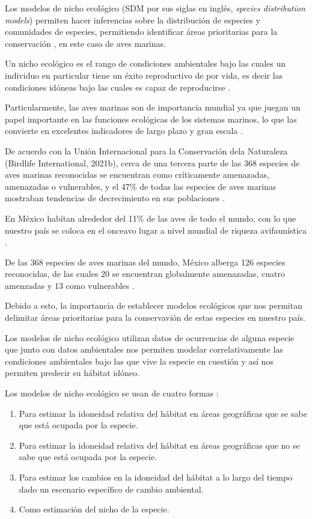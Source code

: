 \documentclass[runningheads,a4paper]{llncs}
\begin{document}
Los modelos de nicho ecológico (SDM por sus siglas en inglés, \textit{species
distribution models}) permiten hacer inferencias sobre la distribución
de especies y comunidades de especies, permitiendo identificar áreas
prioritarias para la conservación \cite{flores2019ecological}, en este caso de
aves marinas.

Un nicho ecológico es el rango de condiciones ambientales bajo las cuales un
individuo en particular tiene un éxito reproductivo de por vida, es decir las
condiciones idóneas bajo las cuales es capaz de reproducirse
\cite{takola2022hutchinson}.

Particularmente, las aves marinas son de importancia mundial ya que juegan un
papel importante en las funciones ecológicas de los sistemas marinos, lo que las
convierte en excelentes indicadores de largo plazo y gran escala
\cite{furness1997seabirds}.

De acuerdo con la Unión Internacional para la Conservación dela Naturaleza
(Birdlife International, 2021b), cerca de una tercera parte de las 368 especies
de aves marinas reconocidas se encuentran como críticamente amenazadas,
amenazadas o vulnerables, y el 47\% de todas las especies de aves marinas
mostraban tendencias de decrecimiento en sus poblaciones \cite{dias2019threats}.

En México habítan alrededor del 11\% de las aves de todo el mundo, con lo que
nuestro país se coloca en el onceavo lugar a nivel mundial de riqueza
avifaunística \cite{mendez2021ecologia}.

De las 368 especies de aves marinas del mundo, México alberga 126 especies
reconocidas, de las cuales 20 se encuentran globalmente amenazadas, cuatro
amenzadas y 13 como vulnerables \cite{mendez2021ecologia}.

Debido a esto, la importancia de establecer modelos ecológicos que nos permitan
delimitar áreas prioritarias para la conservavión de estas especies en nuestro país.

Los modelos de nicho ecológico utilizan datos de ocurrencias de alguna especie
que junto con datos ambientales nos permiten modelar correlativamente las
condiciones ambientales bajo las que vive la especie en cuestión y así nos
permiten predecir su hábitat idóneo.

Los modelos de nicho ecológico se usan de cuatro formas \cite{warren2011ecological}:

\begin{enumerate}
\item Para estimar la idoneidad relativa del hábitat en áreas geográficas que se
sabe que está ocupada por la especie.
\item Para estimar la idoneidad relativa del hábitat en áreas geográficas que no
se sabe que está ocupada por la especie.
\item Para estimar los cambios en la idoneidad del hábitat a lo largo del
tiempo dado un escenario específico de cambio ambiental.
\item Como estimación del nicho de la especie.
\end{enumerate}
\end{document}
